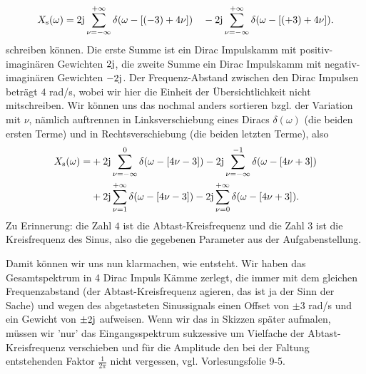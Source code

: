 \begin{ExCalc}
\begin{equation}
X_\mathrm{s}(\omega) = 2\im
\sum_{\nu=-\infty}^{+\infty} \delta(\omega - [(-3)+4\nu])
\quad-
2\im
\sum_{\nu=-\infty}^{+\infty} \delta(\omega - [(+3)+4\nu]).
\end{equation}
schreiben können.
Die erste Summe ist ein Dirac Impulskamm mit positiv-imaginären Gewichten $2\im$, die
zweite Summe ein Dirac Impulskamm mit negativ-imaginären Gewichten $-2\im$. Der Frequenz-Abstand zwischen
den Dirac Impulsen beträgt $4$ rad/s, wobei wir hier die Einheit der
Übersichtlichkeit nicht mitschreiben.
%
Wir können uns das nochmal anders sortieren bzgl. der Variation mit $\nu$,
nämlich auftrennen in Linksverschiebung eines Diracs $\delta(\omega)$
(die beiden ersten Terme) und in Rechtsverschiebung
(die beiden letzten Terme), also
\begin{align}
X_\mathrm{s}(\omega) =
&+2\im\sum_{\nu=-\infty}^{0} \delta(\omega - [4\nu-3])
-2\im\sum_{\nu=-\infty}^{-1} \delta(\omega - [4\nu+3])\\
&+2\im\sum_{\nu=1}^{+\infty} \delta(\omega - [4\nu-3])
-2\im\sum_{\nu=0}^{+\infty} \delta(\omega - [4\nu+3]).
\end{align}
Zu Erinnerung: die Zahl $4$ ist die Abtast-Kreisfrequenz und die Zahl $3$
ist die Kreisfrequenz des Sinus, also die gegebenen Parameter aus der Aufgabenstellung.

Damit können wir uns nun klarmachen, wie
 entsteht. Wir haben das Gesamtspektrum
in 4 Dirac Impuls Kämme zerlegt, die immer mit dem gleichen Frequenzabstand
(der Abtast-Kreisfrequenz agieren, das ist ja der Sinn der Sache) und wegen
des abgetasteten Sinussignals einen Offset von $\pm 3$ rad/s und ein Gewicht von $\pm 2\im$
aufweisen.
Wenn wir das in Skizzen später aufmalen, müssen wir 'nur' das Eingangsspektrum
sukzessive um Vielfache der Abtast-Kreisfrequenz verschieben und für die Amplitude
den bei der Faltung entstehenden Faktor $\frac{1}{2\pi}$ nicht vergessen, vgl.
Vorlesungsfolie 9-5.
\end{ExCalc}

